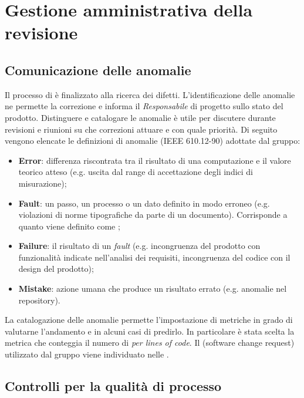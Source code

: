 \section{Gestione amministrativa della revisione}

	\subsection{Comunicazione delle anomalie}
	\label{DefinizioneAnomalie}

	Il processo di  è finalizzato alla ricerca dei difetti. L'identificazione delle anomalie ne permette la correzione e informa il \emph{Responsabile} di progetto sullo stato del prodotto. Distinguere e catalogare le anomalie è utile per discutere durante revisioni e riunioni su che correzioni attuare e con quale priorità. Di seguito vengono elencate le definizioni di anomalie (IEEE 610.12-90) adottate dal gruppo:
	\begin{itemize}
		\item \textbf{Error}: differenza riscontrata tra il risultato di una computazione e il valore teorico atteso (e.g. uscita dal range di accettazione degli indici di misurazione);
		\item \textbf{Fault}: un passo, un processo o un dato definito in modo erroneo (e.g. violazioni di norme tipografiche da parte di un documento). Corrisponde a quanto viene definito come ;
		\item \textbf{Failure}: il risultato di un \emph{fault} (e.g. incongruenza del prodotto con funzionalità indicate nell'analisi dei requisiti, incongruenza del codice con il design del prodotto);
		\item \textbf{Mistake}: azione umana che produce un risultato errato (e.g. anomalie nel repository).
	\end{itemize}
	La catalogazione delle anomalie permette l'impostazione di metriche in grado di valutarne l'andamento e in alcuni casi di predirlo. In particolare è stata scelta la metrica che conteggia il numero di \emph{ per lines of code}. Il  (software change request) utilizzato dal gruppo viene individuato nelle \NormeDiProgetto.


	\subsection{Controlli per la qualità di processo}

